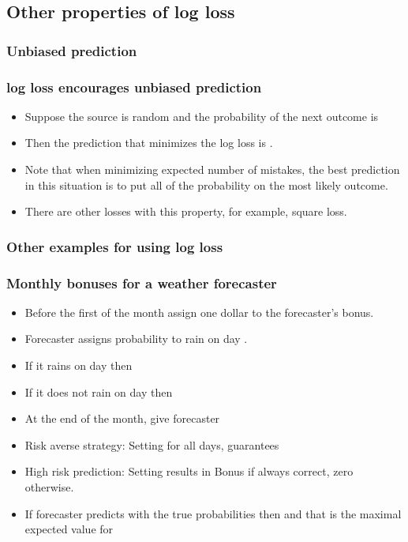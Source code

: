 \documentclass{beamer}
\begin{document}
\subsection{Other properties of log loss}

\subsubsection{Unbiased prediction}
\begin{frame}
\frametitle{log loss encourages unbiased prediction}
\begin{itemize}
\item Suppose the source is random and the probability of the next outcome is  
\item Then the prediction that minimizes the log loss is .
\item Note that when minimizing expected number of mistakes, the best prediction in this situation is to put all of the probability on the
most likely outcome.
\item There are other losses with this property, for example, square loss.
\end{itemize}
\end{frame}

\subsubsection{Other examples for using log loss}

\begin{frame}
\frametitle{Monthly bonuses for a weather forecaster}
\begin{itemize}
\item Before the first of the month assign one dollar to the forecaster's bonus. 
\item Forecaster assigns probability  to rain on day .
\item If it rains on day  then 
\item If it does not rain on day  then 
\item At the end of the month, give forecaster 
\item Risk averse strategy: Setting  for all days, guarantees 
\item High risk prediction: Setting  results in Bonus  if always correct, zero otherwise.
\item If forecaster predicts with the true probabilities then 
 and that is the maximal expected value for 
\end{itemize}
\end{frame}
\end{document}
